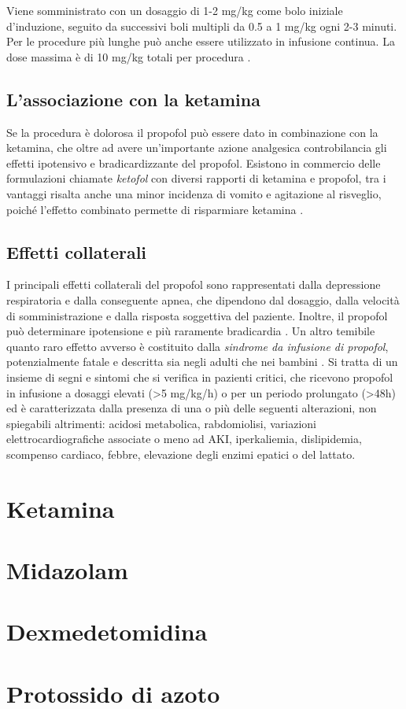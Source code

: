 Viene somministrato con un dosaggio di 1-2 mg/kg come bolo iniziale d'induzione, seguito da successivi boli multipli da 0.5 a 1 mg/kg ogni 2-3 minuti. Per le procedure più lunghe può anche essere utilizzato in infusione continua.
La dose massima è di 10 mg/kg totali per procedura \cite{Simeupsedazione}.

\subsection*{L'associazione con la ketamina}

Se la procedura è dolorosa il propofol può essere dato in combinazione con la ketamina, che oltre ad avere un'importante azione analgesica controbilancia gli effetti ipotensivo e bradicardizzante del propofol. Esistono in commercio delle formulazioni chiamate \emph{ketofol} con diversi rapporti di ketamina e propofol, tra i vantaggi risalta anche una minor incidenza di vomito e agitazione al risveglio, poiché l'effetto combinato permette di risparmiare ketamina \cite{Simeupsedazione}.

\subsection*{Effetti collaterali}

I principali effetti collaterali del propofol sono rappresentati dalla depressione respiratoria e dalla conseguente apnea, che dipendono dal dosaggio, dalla velocità di somministrazione e dalla risposta soggettiva del paziente. Inoltre, il propofol può determinare ipotensione e più raramente bradicardia \cite{propofolsafety2010}.
Un altro temibile quanto raro effetto avverso è costituito dalla \emph{sindrome da infusione di propofol}, potenzialmente fatale e descritta sia negli adulti che nei bambini \cite{Propofolinfusionsyndrome2019}. Si tratta di un insieme di segni e sintomi che si verifica in pazienti critici, che ricevono propofol in infusione a dosaggi elevati (>5 mg/kg/h) o per un periodo prolungato (>48h) ed è caratterizzata dalla presenza di una o più delle seguenti alterazioni, non spiegabili altrimenti: acidosi metabolica, rabdomiolisi, variazioni elettrocardiografiche associate o meno ad AKI, iperkaliemia, dislipidemia, scompenso cardiaco, febbre, elevazione degli enzimi epatici o del lattato. 

\section{Ketamina}

\lipsum[2]

\section{Midazolam}

\lipsum[3]

\section{Dexmedetomidina}

\lipsum[4]

\section{Protossido di azoto}

\lipsum[5]
 